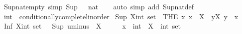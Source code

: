 \begin{isabellebody}
\endisatagproof
{\isafoldproof}%
%
\isadelimproof
\isanewline
%
\endisadelimproof
\isanewline
{}\isamarkupfalse%
\ Sup{\isacharunderscore}{\kern0pt}nat{\isacharunderscore}{\kern0pt}empty\ {\isacharbrackleft}{\kern0pt}simp{\isacharbrackright}{\kern0pt}{\isacharcolon}{\kern0pt}\ {\isachardoublequoteopen}Sup\ {\isacharbraceleft}{\kern0pt}{\isacharbraceright}{\kern0pt}\ {\isacharequal}{\kern0pt}\ {\isacharparenleft}{\kern0pt}{}{\isacharcolon}{\kern0pt}{\isacharcolon}{\kern0pt}nat{\isacharparenright}{\kern0pt}{\isachardoublequoteclose}\isanewline
%
\isadelimproof
\ \ %
\endisadelimproof
%
\isatagproof
{}\isamarkupfalse%
\ {\isacharparenleft}{\kern0pt}auto\ simp\ add{\isacharcolon}{\kern0pt}\ Sup{\isacharunderscore}{\kern0pt}nat{\isacharunderscore}{\kern0pt}def{\isacharparenright}{\kern0pt}%
\endisatagproof
{\isafoldproof}%
%
\isadelimproof
\ \isanewline
%
\endisadelimproof
\isanewline
\isanewline
\isanewline
{}\isamarkupfalse%
\ int\ {\isacharcolon}{\kern0pt}{\isacharcolon}{\kern0pt}\ conditionally{\isacharunderscore}{\kern0pt}complete{\isacharunderscore}{\kern0pt}linorder\isanewline
{}\isanewline
\isanewline
{}\isamarkupfalse%
\ {\isachardoublequoteopen}Sup\ {\isacharparenleft}{\kern0pt}X{\isacharcolon}{\kern0pt}{\isacharcolon}{\kern0pt}int\ set{\isacharparenright}{\kern0pt}\ {\isacharequal}{\kern0pt}\ {\isacharparenleft}{\kern0pt}THE\ x{\isachardot}{\kern0pt}\ x\ {\isasymin}\ X\ {\isasymand}\ {\isacharparenleft}{\kern0pt}{\isasymforall}y{\isasymin}X{\isachardot}{\kern0pt}\ y\ {\isasymle}\ x{\isacharparenright}{\kern0pt}{\isacharparenright}{\kern0pt}{\isachardoublequoteclose}\isanewline
{}\isamarkupfalse%
\ {\isachardoublequoteopen}Inf\ {\isacharparenleft}{\kern0pt}X{\isacharcolon}{\kern0pt}{\isacharcolon}{\kern0pt}int\ set{\isacharparenright}{\kern0pt}\ {\isacharequal}{\kern0pt}\ {\isacharminus}{\kern0pt}\ {\isacharparenleft}{\kern0pt}Sup\ {\isacharparenleft}{\kern0pt}uminus\ {\isacharbackquote}{\kern0pt}\ X{\isacharparenright}{\kern0pt}{\isacharparenright}{\kern0pt}{\isachardoublequoteclose}\isanewline
\isanewline
{}\isamarkupfalse%
\isanewline
%
\isadelimproof
%
\endisadelimproof
%
\isatagproof
{}\isamarkupfalse%
\isanewline
\ \ \isacommand{{\isacharbraceleft}{\kern0pt}}\isamarkupfalse%
\ \isamarkupfalse%
\ x\ {\isacharcolon}{\kern0pt}{\isacharcolon}{\kern0pt}\ int\ \ X\ {\isacharcolon}{\kern0pt}{\isacharcolon}{\kern0pt}\ {\isachardoublequoteopen}int\ set{\isachardoublequoteclose}\ \isamarkupfalse%

\end{isabellebody}
